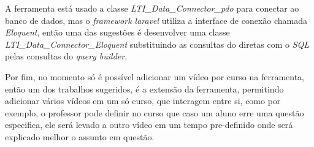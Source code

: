 \begin{sloppypar}
A ferramenta está usado a classe \textit{LTI\_Data\_Connector\_pdo} para conectar ao banco de dados, mas o \textit{framework laravel} utiliza a interface de conexão chamada \textit{Eloquent}, então uma das sugestões é desenvolver uma classe \textit{LTI\_Data\_Connector\_Eloquent} substituindo as consultas do diretas com o \textit{SQL} pelas consultas do \textit{query builder}.
\end{sloppypar}

Por fim, no momento só é possível adicionar um vídeo por curso na ferramenta, então um dos trabalhos sugeridos, é a extensão da ferramenta, permitindo adicionar vários vídeos em um só curso, que interagem entre si, como por exemplo, o professor pode definir no curso que caso um aluno erre uma questão especifica, ele será levado a outro vídeo em um tempo pre-definido onde será explicado melhor o assunto em questão.
